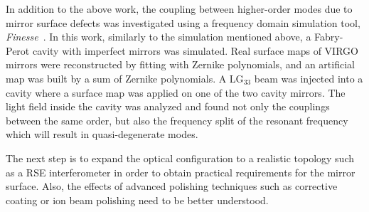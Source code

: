 In addition to the above work, the coupling between higher-order modes
due to mirror surface defects was investigated using a frequency
domain simulation tool, \emph{Finesse}~\cite{bond10}.
In this work, similarly to the simulation mentioned above,
a Fabry-Perot cavity with imperfect mirrors was simulated.
Real surface maps of VIRGO mirrors
were reconstructed by fitting with Zernike polynomials,
and an artificial map was built by a sum of Zernike polynomials.
A LG$_{33}$ beam was injected into a cavity where a surface map
was applied on one of the two cavity mirrors.
The light field inside the cavity was analyzed and found
not only the couplings between the same order,
but also the frequency split of the resonant frequency
which will result in quasi-degenerate modes.

The next step is to expand the optical configuration to a realistic topology such as a RSE interferometer in order to obtain practical requirements for the mirror surface. Also, the effects of advanced polishing techniques such as corrective coating or ion beam polishing
need to be better understood.



